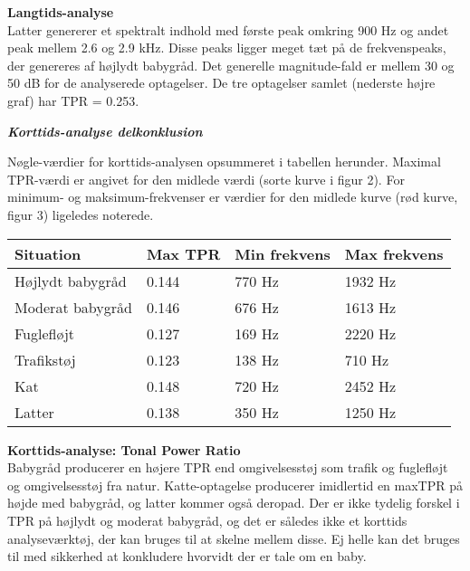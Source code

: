 
\newpage
\textbf{Langtids-analyse} \\
Latter genererer et spektralt indhold med første peak omkring 900 Hz og andet peak mellem 2.6 og 2.9 kHz. Disse peaks ligger meget tæt på de frekvenspeaks, der genereres af højlydt babygråd. Det generelle magnitude-fald er mellem 30 og 50 dB for de analyserede optagelser. De tre optagelser samlet (nederste højre graf) har TPR = 0.253.



\newpage
\begin{center} \textit{\textbf{Korttids-analyse delkonklusion}} \end{center}
Nøgle-værdier for korttids-analysen opsummeret i tabellen herunder. Maximal TPR-værdi er angivet for den midlede værdi (sorte kurve i figur 2). For minimum- og maksimum-frekvenser er værdier for den midlede kurve (rød kurve, figur 3) ligeledes noterede.

\begin{center}
    \begin{tabular}{ | l | l | l | l |}
    \hline
    \textbf{Situation} 	& \textbf{Max TPR}  &\textbf{Min frekvens}	&\textbf{Max frekvens}  	\\ \hline
    Højlydt babygråd 	& 0.144   				&770 Hz 				&1932 Hz				\\ \hline
    Moderat babygråd 	& 0.146  				&676 Hz 				&1613 Hz				\\ \hline
    Fuglefløjt 			& 0.127  				&169 Hz 				&2220 Hz				\\ \hline	
    Trafikstøj 			& 0.123  				&138 Hz 				&710 Hz					\\ \hline
    Kat 				& 0.148  				&720 Hz					&2452 Hz				\\ \hline
    Latter 				& 0.138  				&350 Hz					&1250 Hz				\\ \hline
    \end{tabular}
\end{center}

\textbf{Korttids-analyse: Tonal Power Ratio}	\\
Babygråd producerer en højere TPR end omgivelsesstøj som trafik og fuglefløjt og omgivelsesstøj fra natur. Katte-optagelse producerer imidlertid en maxTPR på højde med babygråd, og latter kommer også deropad. Der er ikke tydelig forskel i TPR på højlydt og moderat babygråd, og det er således ikke et korttids analyseværktøj, der kan bruges til at skelne mellem disse. Ej helle kan det bruges til med sikkerhed at konkludere hvorvidt der er tale om en baby.

